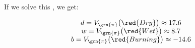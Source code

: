         If we solve this , we get:

        \begin{equation}
            \begin{matrix}
                d = V_{\grn{\pi}}\big(\red{Dry}\big) \approx 17.6\\
                w = V_{\grn{\pi}}\big(\red{Wet}\big) \approx 8.7\\
                b = V_{\grn{\pi}}\big(\red{Burning}\big) \approx -14.6\\
            \end{matrix}
        \end{equation}

        

        

